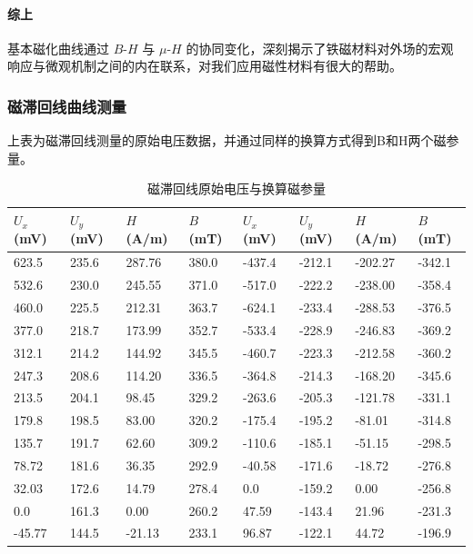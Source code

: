 \documentclass[]{../template/Report}%
\begin{document}
\begin{fullreportonly}
\paragraph{综上}基本磁化曲线通过 $B$-$H$ 与 $\mu$-$H$ 的协同变化，深刻揭示了铁磁材料对外场的宏观响应与微观机制之间的内在联系，对我们应用磁性材料有很大的帮助。


\subsubsection{磁滞回线曲线测量}
上表为磁滞回线测量的原始电压数据，并通过同样的换算方式得到B和H两个磁参量。

\begin{table}[H]
    \centering
    \caption{磁滞回线原始电压与换算磁参量}
    \scriptsize
    \setlength{\tabcolsep}{2.8pt}
    \begin{tabularx}{\textwidth}{XXXX|XXXX}
        \toprule
        $U_x$ (mV) & $U_y$ (mV) & $H$ (A/m) & $B$ (mT) & $U_x$ (mV) & $U_y$ (mV) & $H$ (A/m) & $B$ (mT) \\
        \midrule
        623.5 & 235.6 & 287.76 & 380.0 & -437.4 & -212.1 & -202.27 & -342.1 \\
        532.6 & 230.0 & 245.55 & 371.0 & -517.0 & -222.2 & -238.00 & -358.4 \\
        460.0 & 225.5 & 212.31 & 363.7 & -624.1 & -233.4 & -288.53 & -376.5 \\
        377.0 & 218.7 & 173.99 & 352.7 & -533.4 & -228.9 & -246.83 & -369.2 \\
        312.1 & 214.2 & 144.92 & 345.5 & -460.7 & -223.3 & -212.58 & -360.2 \\
        247.3 & 208.6 & 114.20 & 336.5 & -364.8 & -214.3 & -168.20 & -345.6 \\
        213.5 & 204.1 & 98.45 & 329.2 & -263.6 & -205.3 & -121.78 & -331.1 \\
        179.8 & 198.5 & 83.00 & 320.2 & -175.4 & -195.2 & -81.01 & -314.8 \\
        135.7 & 191.7 & 62.60 & 309.2 & -110.6 & -185.1 & -51.15 & -298.5 \\
        78.72 & 181.6 & 36.35 & 292.9 & -40.58 & -171.6 & -18.72 & -276.8 \\
        32.03 & 172.6 & 14.79 & 278.4 & 0.0 & -159.2 & 0.00 & -256.8 \\
        0.0 & 161.3 & 0.00 & 260.2 & 47.59 & -143.4 & 21.96 & -231.3 \\
        -45.77 & 144.5 & -21.13 & 233.1 & 96.87 & -122.1 & 44.72 & -196.9 \\

\end{tabularx}
\end{table}
\end{fullreportonly}
\end{document}
